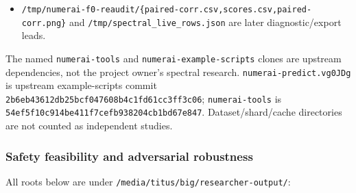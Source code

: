 \documentclass[
  british,
  10pt,
  a4paper,
]{article}
\begin{document}
\begin{itemize}
  and matching AdamW files where present; additional named c14/c19
  directories were discovered but their raw contents were not
  individually audited.
\item
  \texttt{/\allowbreak{}tmp/\allowbreak{}numerai-\allowbreak{}f0-\allowbreak{}reaudit/\allowbreak{}\{\allowbreak{}paired-\allowbreak{}corr.\allowbreak{}csv,\allowbreak{}scores.\allowbreak{}csv,\allowbreak{}paired-\allowbreak{}corr.\allowbreak{}png\}\allowbreak{}}
  and
  \texttt{/\allowbreak{}tmp/\allowbreak{}spectral\_\allowbreak{}live\_\allowbreak{}rows.\allowbreak{}json}
  are later diagnostic/\allowbreak{}export leads.
\end{itemize}

The named \texttt{numerai-\allowbreak{}tools} and
\texttt{numerai-\allowbreak{}example-\allowbreak{}scripts} clones are
upstream dependencies\allowbreak{},\allowbreak{} not the project owner's spectral
research. \texttt{numerai-\allowbreak{}predict.\allowbreak{}vg0JDg} is
upstream example-\allowbreak{}scripts commit
\texttt{2b6eb43612db\allowbreak{}25bcf047608b\allowbreak{}4c1fd61cc3ff\allowbreak{}3c06};
\texttt{numerai-\allowbreak{}tools} is
\texttt{54ef5f10c914\allowbreak{}be411f7cefb9\allowbreak{}38204cb1bd67\allowbreak{}e847}.
Dataset/\allowbreak{}shard/\allowbreak{}cache directories are not
counted as independent studies.

\subsubsection{Safety feasibility and adversarial
robustness}\label{repository-inventory--safety-feasibility-and-adversarial-robustness}

All roots below are under
\texttt{/\allowbreak{}media/\allowbreak{}titus/\allowbreak{}big/\allowbreak{}researcher-\allowbreak{}output/\allowbreak{}}:
\end{document}
